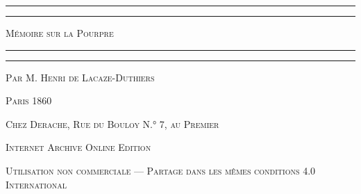 \documentclass[a4paper, 11pt, oneside, polutonikogreek, french]{article}
\begin{document}
\begin{titlepage} %
	\centering %

	
	\rule{\textwidth}{1.6pt}\vspace*{-\baselineskip}\vspace*{2pt} %
	\rule{\textwidth}{0.4pt} %
	
	\vspace{1\baselineskip} %
	
	{\scshape\Huge Mémoire sur la Pourpre}
	
	\vspace{1\baselineskip} %

	\rule{\textwidth}{0.4pt}\vspace*{-\baselineskip}\vspace{3.2pt} %
	\rule{\textwidth}{1.6pt} %
	
	\vspace{1\baselineskip} %
	
	
	{\scshape Par \Large M. Henri de Lacaze-Duthiers} %
	
	\vspace*{1\baselineskip} %
    
        \vspace*{\fill}

	\vspace{1\baselineskip}

	{\small\scshape Paris 1860}
	
	{\small\scshape{Chez Derache, Rue du Bouloy N.° 7, au Premier}}
	
	\vspace{0.5\baselineskip} %

        \scshape Internet Archive Online Edition  %
	
	{\scshape\small Utilisation non commerciale --- Partage dans les mêmes conditions 4.0 International} %
\end{titlepage}
\setlength{\parskip}{1mm plus1mm minus1mm}
\clearpage
\tableofcontents
\clearpage
\end{document}
